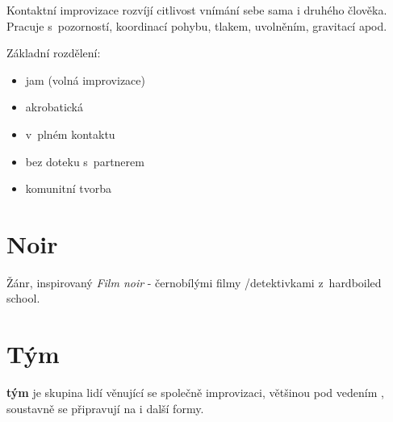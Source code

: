Kontaktní improvizace rozvíjí citlivost vnímání sebe sama i druhého člověka. Pracuje s~pozorností, koordinací pohybu, tlakem, uvolněním, gravitací apod. 
 
Základní rozdělení: 
 
\begin{itemize}
\item  jam (volná improvizace)
\item  akrobatická
\item  v~plném kontaktu
\item  bez doteku s~partnerem
\item  komunitní tvorba
\end{itemize}
 
\needspace{5cm} \section{Noir} \label{noir} Žánr, inspirovaný \textit{Film noir}  - černobílými filmy /detektivkami z~hardboiled school. 
 
 
\needspace{5cm} \section{Tým} \label{tým}  \textbf{tým} je skupina lidí věnující se společně improvizaci, většinou pod vedením , soustavně se připravují na  i další formy. 
 

